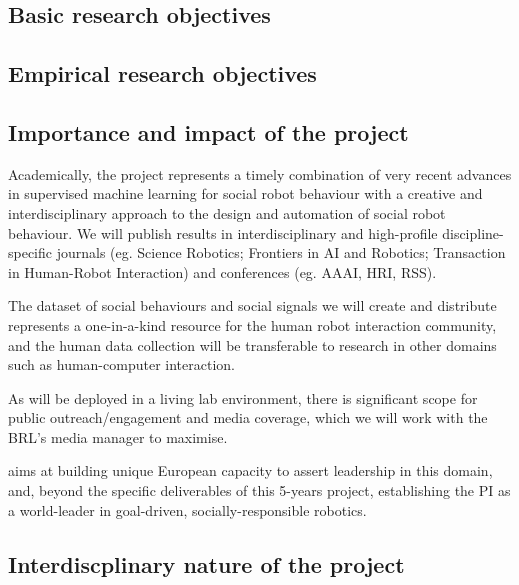 \subsection{Basic research objectives}

\subsection{Empirical research objectives}


\subsection{Importance and impact of the project}


Academically, the \project project represents a timely combination of
very recent advances in supervised machine learning for social robot
behaviour with a creative and interdisciplinary approach to the design
and automation of social robot behaviour. 
We will publish \project results in interdisciplinary and high-profile
discipline-specific journals (eg. Science Robotics; Frontiers in AI and
Robotics; Transaction in Human-Robot Interaction) and conferences (eg. AAAI,
HRI, RSS).

The dataset of social behaviours and social signals we will create and
distribute represents a one-in-a-kind resource for the human robot
interaction community, and the human data collection will be
transferable to research in other domains such as human-computer
interaction.

As \project will be deployed in a living lab environment, there is
significant scope for public outreach/engagement and media coverage,
which we will work with the BRL's media manager to maximise.


\project aims at building unique European capacity to assert leadership in this
domain, and, beyond the specific deliverables of this 5-years project,
establishing the PI as a world-leader in goal-driven, socially-responsible
robotics.


\subsection{Interdiscplinary nature of the project}


